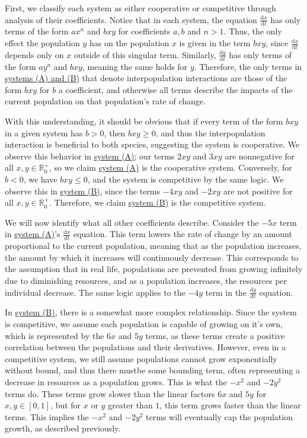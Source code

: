 \documentclass[11pt, letterpaper]{article}
\begin{document}
First, we classify each system as either cooperative or competitive through analysis of their coefficients. Notice that in each system, the equation $\frac{\mathrm{d}x}{\mathrm{d}t} $ has only terms of the form $ax^n$ and $bxy$ for coefficients $a,b$ and $n>1$. Thus, the only effect the population $y$ has on the population $x$ is given in the term $bxy$, since $\frac{\mathrm{d}x}{\mathrm{d}t} $ depends only on $x$ outside of this singular term. Similarly, $\frac{\mathrm{d}y}{\mathrm{d}t} $ has only terms of the form $ay^n$ and $bxy$, meaning the same holds for $y$. Therefore, the only terms in \hyperref[sys]{systems (A) and (B)} that denote interpopulation interactions are those of the form $bxy$ for $b$ a coefficient, and otherwise all terms describe the impacts of the current population on that population's rate of change.

With this understanding, it should be obvious that if every term of the form $bxy$ in a given system has $b>0$, then $bxy\geq 0$, and thus the interpopulation interaction is beneficial to both species, suggesting the system is cooperative. We observe this behavior in \hyperref[sys]{system (A)}; our terms $2xy$ and $3xy$ are nonnegative for all $x,y\in\mathbb{R}_0^+$, so we claim \hyperref[sys]{system (A)} is the cooperative system. Conversely, for $b<0$, we have $bxy\leq 0$, and the system is competitive by the same logic. We observe this in \hyperref[sys]{system (B)}, since the terms $-4xy$ and $-2xy$ are not positive for all $x,y\in\mathbb{R}_0^+$. Therefore, we claim \hyperref[sys]{system (B)} is the competitive system.

We will now identify what all other coefficients describe. Consider the $-5x$ term in \hyperref[sys]{system (A)}'s $\frac{\mathrm{d}x}{\mathrm{d}t} $ equation. This term lowers the rate of change by an amount proportional to the current population, meaning that as the population increases, the amount by which it increases will continuously decrease. This corresponds to the assumption that in real life, populations are prevented from growing infinitely due to diminishing resources, and as a population increases, the resources per individual decrease. The same logic applies to the $-4y$ term in the $\frac{\mathrm{d}y}{\mathrm{d}t} $ equation.

In \hyperref[sys]{system (B)}, there is a somewhat more complex relationship. Since the system is competitive, we assume each population is capable of growing on it's own, which is represented by the $6x$ and $5y$ terms, as these terms create a positive correlation between the populations and their derivatives. However, even in a competitive system, we still assume populations cannot grow exponentially without bound, and thus there mustbe some bounding term, often representing a decrease in resources as a population grows. This is what the $-x^2$ and $-2y^2$ terms do. These terms grow slower than the linear factors $6x$ and $5y$ for $x,y\in[0,1]$, but for $x$ or $y$ greater than $1$, this term grows faster than the linear terms. This implies the $-x^2$ and $-2y^2$ terms will eventually cap the population growth, as described previously.
\end{document}
